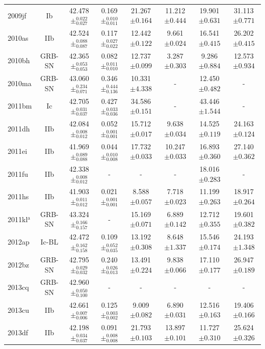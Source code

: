 \documentclass[a4paper,fleqn,usenatbib]{mnras}
\begin{document}
\begin{table}
\begin{minipage}{160mm}
\begin{tabular}{lccccccc}
2009jf & Ib & 42.478$\pm^{0.022}_{0.027}$ & 0.169$\pm^{0.010}_{0.011}$ & 21.267$\pm{0.164}$ & 11.212$\pm 0.444$ & 19.901$\pm 0.631$ & 31.113$\pm 0.771$\\
2010as & IIb & 42.524$\pm^{0.088}_{0.087}$ & 0.117$\pm^{0.027}_{0.022}$ & 12.442$\pm{0.122}$ & 9.661$\pm 0.024$ & 16.541$\pm 0.415$ & 26.202$\pm 0.415$\\
2010bh & GRB-SN & 42.365$\pm^{0.053}_{0.053}$ & 0.082$\pm^{0.011}_{0.010}$ & 12.737$\pm{0.099}$ & 3.287$\pm 0.303$ & 9.286$\pm 0.884$ & 12.573$\pm 0.934$\\
2010ma & GRB-SN & 43.060$\pm^{0.234}_{0.071}$ & 0.346$\pm^{0.444}_{0.136}$ & 10.331$\pm{4.338}$ & - & 12.450$\pm 0.482$ & -\\
2011bm & Ic & 42.705$\pm^{0.031}_{0.037}$ & 0.427$\pm^{0.033}_{0.036}$ & 34.586$\pm{0.151}$ & - & 43.446$\pm 1.544$ & -\\
2011dh & IIb & 42.084$\pm^{0.008}_{0.012}$ & 0.052$\pm^{0.001}_{0.001}$ & 15.712$\pm{0.017}$ & 9.638$\pm 0.034$ & 14.525$\pm 0.119$ & 24.163$\pm 0.124$\\
2011ei & IIb & 41.969$\pm^{0.089}_{0.088}$ & 0.044$\pm^{0.010}_{0.008}$ & 17.732$\pm{0.033}$ & 10.247$\pm 0.033$ & 16.893$\pm 0.360$ & 27.140$\pm 0.362$\\
2011fu & IIb & 42.338$\pm^{0.008}_{0.012}$ & - & - & - & 18.016$\pm 0.283$ & -\\
2011hs & IIb & 41.903$\pm^{0.011}_{0.012}$ & 0.021$\pm^{0.001}_{0.001}$ & 8.588$\pm{0.057}$ & 7.718$\pm 0.023$ & 11.199$\pm 0.263$ & 18.917$\pm 0.264$\\
2011kl$^{\mathrm{a}}$ & GRB-SN & 43.324$\pm^{0.166}_{0.157}$ &-& 15.169$\pm{0.071}$ & 6.889$\pm 0.142$ & 12.712$\pm 0.355$ & 19.601$\pm 0.382$\\
2012ap & Ic-BL & 42.472$\pm^{0.162}_{0.158}$ & 0.109$\pm^{0.052}_{0.035}$ & 13.192$\pm{0.308}$ & 8.648$\pm 1.337$ & 15.546$\pm 0.174$ & 24.193$\pm 1.348$\\
2012bz & GRB-SN & 42.795$\pm^{0.029}_{0.032}$ & 0.240$\pm^{0.026}_{0.013}$ & 13.491$\pm{0.224}$ & 9.838$\pm 0.066$ & 17.110$\pm 0.177$ & 26.947$\pm 0.189$\\
2013cq & GRB-SN & 42.960$\pm^{0.050}_{0.100}$ & - & - & - & - & -\\
2013cu & IIb & 42.661$\pm^{0.007}_{0.006}$ & 0.125$\pm^{0.003}_{0.002}$ & 9.009$\pm{0.082}$ & 6.890$\pm 0.031$ & 12.516$\pm 0.163$ & 19.406$\pm 0.166$\\
2013df & IIb & 42.198$\pm^{0.034}_{0.037}$ & 0.091$\pm^{0.008}_{0.008}$ & 21.793$\pm{0.103}$ & 13.897$\pm 0.101$ & 11.727$\pm 0.310$ & 25.624$\pm 0.326$\\

\end{tabular}
\end{minipage}
\end{table}
\end{document}
